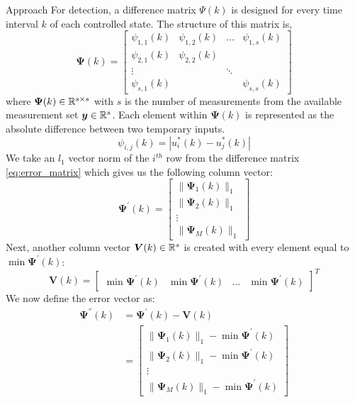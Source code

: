 \begin{section}{Approach}
For detection, a difference matrix $\Psi(k)$ is designed for every time interval $k$ of each controlled state. The structure of this matrix is,
    \begin{equation}
    \label{eq:error_matrix}
	\bm{\Psi}(k)=\begin{bmatrix} \psi_{1,1}(k) & \psi_{1,2}(k) & \dots & \psi_{1,s}(k) \\ \psi_{2,1}(k) & \psi_{2,2}(k) &  &  \\ \vdots &  & \ddots &  \\ \psi_{s,1}(k) &  &  & \psi_{s,s}(k) \end{bmatrix}
	\end{equation}
where $\bm{\Psi}(k) \in \mathbb{R}^{s\times s}$ with $s$ is the number of measurements from the available measurement set $\bm{y} \in \mathbb{R}^s$. Each element within $\bm{\Psi}(k)$ is represented as the absolute difference between two temporary inputs.
    \begin{equation}
        \psi_{i,j}(k)=|u^*_i(k)-u^*_j(k)|
    \end{equation}
We take an $l_1$ vector norm of the $i^{th}$ row from the difference matrix \eqref{eq:error_matrix} which gives us the following column vector:
    \begin{equation}
	\bm{\Psi^{'}}(k)=\begin{bmatrix} \lVert{\bm{\Psi}_1(k)}\rVert_1 \\ \lVert{\bm{\Psi}_2(k)}\rVert_1 \\ \vdots \\ \lVert{\bm{\Psi}_M(k)}\rVert_1 \end{bmatrix}
	\end{equation}
Next, another column vector $\bm{V}(k) \in \mathbb{R}^s$ is created with every element equal to $\min \bm{\Psi}^{'}(k)$:
    \begin{equation}
	\bm{V}(k)=\begin{bmatrix} \min \bm{\Psi}^{'}(k) & \min \bm{\Psi}^{'}(k) & \dots & \min \bm{\Psi}^{'}(k) \end{bmatrix}^T
	\end{equation}
We now define the error vector as:
    \begin{align}
    \label{eq:Psi2}
	\bm{\Psi^{''}}(k)&=\bm{\Psi^{'}}(k)-\bm{V}(k) \\
	& =\begin{bmatrix} \lVert{\bm{\Psi}_1(k)}\rVert_1 - \min \bm{\Psi}^{'}(k)\\ \lVert{\bm{\Psi}_2(k)}\rVert_1 - \min \bm{\Psi}^{'}(k) \\ \vdots \\ \lVert{\bm{\Psi}_M(k)}\rVert_1 - \min \bm{\Psi}^{'}(k) \end{bmatrix}
	\end{align}
	

\end{section}
